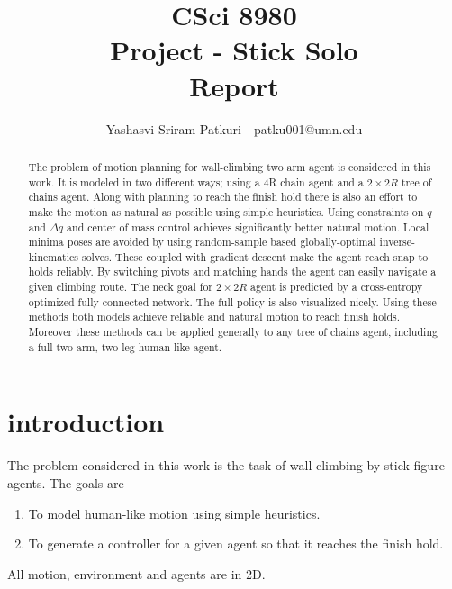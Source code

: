 \documentclass[12pt]{article}
\title{CSci 8980\\Project - Stick Solo\\Report}
\author{
Yashasvi Sriram Patkuri - patku001@umn.edu\\
}
\begin{document}
\maketitle

\pagebreak

\begin{abstract}
The problem of motion planning for wall-climbing two arm agent is considered in this work.
It is modeled in two different ways; using a 4R chain agent and a $2 \times 2R$ tree of chains agent.
Along with planning to reach the finish hold there is also an effort to make the motion as natural as possible using simple heuristics.
Using constraints on $q$ and $\Delta q$ and center of mass control achieves significantly better natural motion.
Local minima poses are avoided by using random-sample based globally-optimal inverse-kinematics solves.
These coupled with gradient descent make the agent reach snap to holds reliably.
By switching pivots and matching hands the agent can easily navigate a given climbing route.
The neck goal for $2 \times 2R$ agent is predicted by a cross-entropy optimized fully connected network.
The full policy is also visualized nicely.
Using these methods both models achieve reliable and natural motion to reach finish holds.
Moreover these methods can be applied generally to any tree of chains agent, including a full two arm, two leg human-like agent.
\end{abstract}

\section{introduction}
The problem considered in this work is the task of wall climbing by stick-figure agents.
The goals are
\begin{enumerate}[nolistsep]
    \item To model human-like motion using simple heuristics.
    \item To generate a controller for a given agent so that it reaches the finish hold.
\end{enumerate}
All motion, environment and agents are in 2D.
\end{document}
